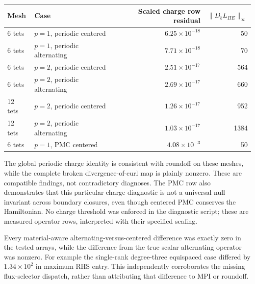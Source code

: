 \begin{center}
\begin{tabular}{llrr}
\toprule
Mesh & Case & Scaled charge row residual & \(\|D_bL_{HE}\|_\infty\)\\\midrule
6 tets & \(p=1\), periodic centered & \(6.25\times10^{-18}\) & 50\\
6 tets & \(p=1\), periodic alternating & \(7.71\times10^{-18}\) & 70\\
6 tets & \(p=2\), periodic centered & \(2.51\times10^{-17}\) & 564\\
6 tets & \(p=2\), periodic alternating & \(2.69\times10^{-17}\) & 660\\
12 tets & \(p=2\), periodic centered & \(1.26\times10^{-17}\) & 952\\
12 tets & \(p=2\), periodic alternating & \(1.03\times10^{-17}\) & 1384\\
6 tets & \(p=1\), PMC centered & \(4.08\times10^{-3}\) & 50\\
\bottomrule
\end{tabular}
\end{center}
The global periodic charge identity is consistent with roundoff on these
meshes, while the complete broken divergence-of-curl map is plainly nonzero.
These are compatible findings, not contradictory diagnoses. The PMC row
also demonstrates that this particular charge diagnostic is not a universal
null invariant across boundary closures, even though centered PMC conserves
the Hamiltonian. No charge threshold was enforced in the diagnostic script;
these are measured operator rows, interpreted with their specified scaling.

Every material-aware alternating-versus-centered difference was exactly
zero in the tested arrays, while the difference from the true scalar
alternating operator was nonzero. For example the single-rank degree-three
equispaced case differed by \(1.34\times10^2\) in maximum RHS entry.
This independently corroborates the missing flux-selector dispatch, rather
than attributing that difference to MPI or roundoff.
